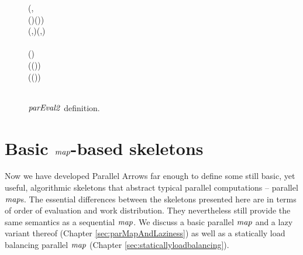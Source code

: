\documentclass[paper=A4,twoside=true,openright,parskip=full,chapterprefix=true,headings=normal,bibliography=totoc,listof=totoc,titlepage=on,captions=tableabove,draft=false,british]{scrreprt}%
\begin{document}
\begin{figure}[h]
\centering
\begin{hscode}\SaveRestoreHook
{}%
%
%
\>[B]{}\mathbin{::}(\;,{}\<[E]%
\\
\>[B]{}\<[5]%
\>[5]{}\;\;(\;\;)\;(\;\;)\;)\Rightarrow {}\<[E]%
\\
\>[B]{}\<[5]%
\>[5]{}\to {}\;\;\to {}\;\;\to {}\;(,)\;(,){}\<[E]%
\\
\>[B]{}\;\;\;\mathrel{=}{}\<[E]%
\\
\>[B]{}\<[5]%
\>[5]{}\;\mathbin{*\!*\!*}(\;\mathbin{>\!\!>\!\!>}\;)\mathbin{>\!\!>\!\!>}{}\<[E]%
\\
\>[B]{}\<[5]%
\>[5]{}\;(\;(\mathbin{:}))\mathbin{>\!\!>\!\!>}{}\<[E]%
\\
\>[B]{}\<[5]%
\>[5]{}\;\;(\;\;(\mathbin{+\!\!+\!\!+}))\mathbin{>\!\!>\!\!>}{}\<[E]%
\\
\>[B]{}\<[5]%
\>[5]{}\;\mathbin{>\!\!>\!\!>}{}\<[E]%
\\
\>[B]{}\<[5]%
\>[5]{}\;\mathbin{*\!*\!*}\;\<[E]%
\ColumnHook
\end{hscode}\resethooks
\caption{\ensuremath{\Varid{parEval2}} definition.}\label{fig:parEval2}\end{figure}

\newpage

\hypertarget{basic-map-based-skeletons}{%
\section{\texorpdfstring{Basic \ensuremath{\Varid{map}}-based
skeletons}{Basic -based skeletons}}\label{basic-map-based-skeletons}}

\label{sec:skeletons} \label{sec:map-skeletons}

Now we have developed Parallel Arrows far enough to define some still
basic, yet useful, algorithmic skeletons that abstract typical parallel
computations -- parallel \ensuremath{\Varid{map}}s. The essential differences between the
skeletons presented here are in terms of order of evaluation and work
distribution. They nevertheless still provide the same semantics as a
sequential \ensuremath{\Varid{map}}. We discuss a basic parallel \ensuremath{\Varid{map}} and a lazy variant
thereof (Chapter \ref{sec:parMapAndLaziness}) as well as a statically
load balancing parallel \ensuremath{\Varid{map}} (Chapter
\ref{sec:staticallyloadbalancing}).
\end{document}
